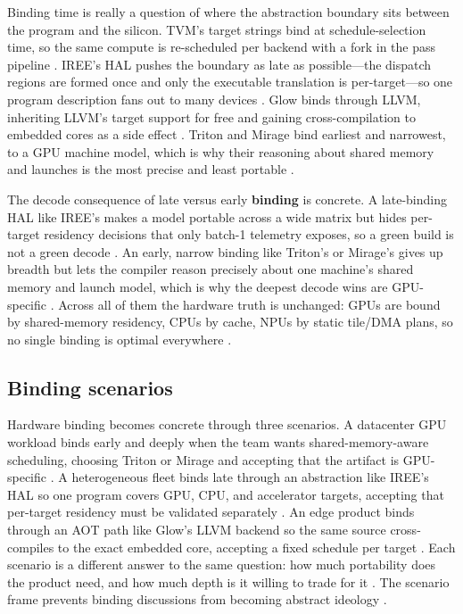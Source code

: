 Binding time is really a question of where the abstraction boundary sits between the program and the silicon. TVM's target strings bind at schedule-selection time, so the same compute is re-scheduled per backend with a fork in the pass pipeline \citep{chen2018tvm}. IREE's HAL pushes the boundary as late as possible---the dispatch regions are formed once and only the executable translation is per-target---so one program description fans out to many devices \citep{iree2024}. Glow binds through LLVM, inheriting LLVM's target support for free and gaining cross-compilation to embedded cores as a side effect \citep{rotem2018glow}. Triton and Mirage bind earliest and narrowest, to a GPU machine model, which is why their reasoning about shared memory and launches is the most precise and least portable \citep{tillet2019triton,wu2024mirage}.

The decode consequence of late versus early \textbf{binding} is concrete. A late-binding HAL like IREE's makes a model portable across a wide matrix but hides per-target residency decisions that only batch-1 telemetry exposes, so a green build is not a green decode \citep{iree2024,taxbreak2026}. An early, narrow binding like Triton's or Mirage's gives up breadth but lets the compiler reason precisely about one machine's shared memory and launch model, which is why the deepest decode wins are GPU-specific \citep{memoryfloor2026,semianalysis2024tma}. Across all of them the hardware truth is unchanged: GPUs are bound by shared-memory residency, CPUs by cache, NPUs by static tile/DMA plans, so no single binding is optimal everywhere \citep{nvidia2022hopper,amd2024xdna,amd2024aie}.

\subsection{Binding scenarios}

Hardware binding becomes concrete through three scenarios. A datacenter GPU workload binds early and deeply when the team wants shared-memory-aware scheduling, choosing Triton or Mirage and accepting that the artifact is GPU-specific \citep{tritonlang2024,wu2024mirage}. A heterogeneous fleet binds late through an abstraction like IREE's HAL so one program covers GPU, CPU, and accelerator targets, accepting that per-target residency must be validated separately \citep{iree2024,amd2024aie}. An edge product binds through an AOT path like Glow's LLVM backend so the same source cross-compiles to the exact embedded core, accepting a fixed schedule per target \citep{rotem2018glow,dlbook}. Each scenario is a different answer to the same question: how much portability does the product need, and how much depth is it willing to trade for it \citep{patel2025llminference,memoryfloor2026}. The scenario frame prevents binding discussions from becoming abstract ideology \citep{taxbreak2026,chen2020compilerbasedhardw}.


